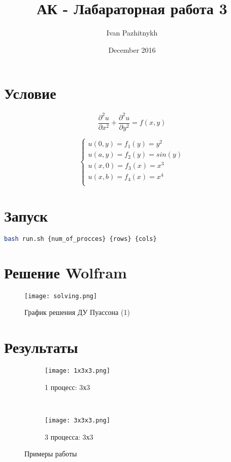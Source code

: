 \documentclass{article}
\title{АК - Лабараторная работа 3}
\author{Ivan Pazhitnykh}
\date{December 2016}
\begin{document}
\maketitle
\section{Условие}

\begin{equation}
    \frac{\partial^2u}{\partial x^2} + \frac{\partial^2u}{\partial y^2} = f(x,y)
\end{equation}

\begin{equation*}
\begin{cases}
    u(0,y)=f_1(y)=y^2 \\
    u(a,y)=f_2(y)=sin(y) \\
    u(x,0)=f_3(x)=x^3 \\
    u(x,b)=f_4(x)=x^4  \\
\end{cases}
\end{equation*}

\section{Запуск}
\begin{lstlisting}[language=bash]
    bash run.sh {num_of_procces} {rows} {cols}
\end{lstlisting}

\section{Решение Wolfram}
\begin{figure}[h]
    \centering
    \texttt{[image: solving.png]}
    \caption{График решения ДУ Пуассона (1)}
    \label{wf}
\end{figure}

\section{Результаты}

\begin{figure}[h]
    \centering
    \begin{subfigure}[h]{0.45\textwidth}
        \texttt{[image: 1x3x3.png]}
        \caption{1 процесс: 3х3}
        \label{s1}
    \end{subfigure}
    ~
    \begin{subfigure}[h]{0.45\textwidth}
        \texttt{[image: 3x3x3.png]}
        \caption{3 процесса: 3х3}
        \label{s2}
    \end{subfigure}
    \caption{Примеры работы}
\end{figure}
\end{document}
